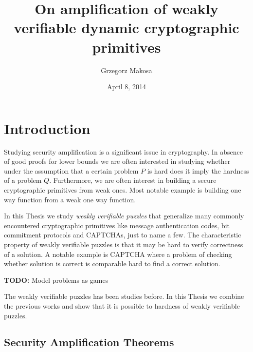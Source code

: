 \documentclass[11pt,a4paper,titlepage]{memoir}
\title{On amplification of weakly verifiable dynamic cryptographic primitives}
\author{Grzegorz Makosa}
\date{April 8, 2014}
\begin{document}
\frontmatter

%

\cleartorecto
\tableofcontents
\mainmatter

\chapter{Introduction}
Studying security amplification is a significant issue in cryptography.
In absence of good proofs for lower bounds we are often interested in studying
whether under the assumption that a certain problem $P$ is hard does it imply the hardness
of a problem $Q$. Furthermore, we are often interest in building a secure cryptographic primitives
from weak ones. Most notable example is building one way function from a weak one way function.

In this Thesis we study \textit{weakly verifiable puzzles} that generalize
many commonly encountered cryptographic primitives like message authentication codes, bit commitment protocols and CAPTCHAs, just to name a few.
The characteristic property of weakly verifiable puzzles is that it may be hard to verify correctness of a solution.
A notable example is CAPTCHA where a problem of checking whether solution is correct is comparable hard to find a correct solution.

\begin{todo}
  \textbf{TODO:} Model problems as games
\end{todo}

The weakly verifiable puzzles has been studies before.
In this Thesis we combine the previous works and show that it is possible to hardness of weakly verifiable puzzles.

\section{Security Amplification Theorems}
\end{document}
